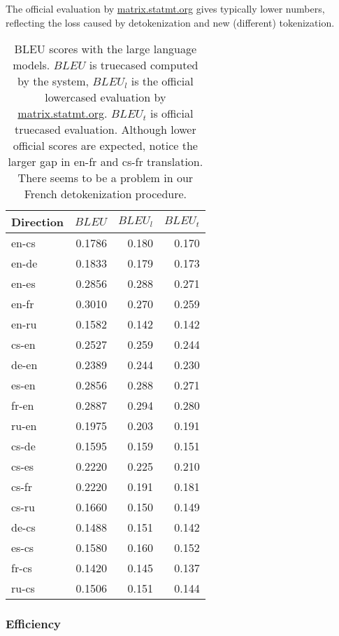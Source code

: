 \documentclass[11pt,letterpaper]{article}
\begin{document}
The official evaluation by \url{matrix.statmt.org} gives typically
lower numbers, reflecting the loss caused by detokenization and
new (different) tokenization.

\begin{table}[htbl]
\begin{center}
\begin{tabular}{l | r r r}
Direction & $BLEU$ & $BLEU_l$ & $BLEU_t$\\
\hline
en-cs & 0.1786 & 0.180 & 0.170\\
en-de & 0.1833 & 0.179 & 0.173\\
en-es & 0.2856 & 0.288 & 0.271\\
en-fr & 0.3010 & 0.270 & 0.259\\
en-ru & 0.1582 & 0.142 & 0.142\\
cs-en & 0.2527 & 0.259 & 0.244\\
de-en & 0.2389 & 0.244 & 0.230\\
es-en & 0.2856 & 0.288 & 0.271\\
fr-en & 0.2887 & 0.294 & 0.280\\
ru-en & 0.1975 & 0.203 & 0.191\\
\hline
cs-de & 0.1595 & 0.159 & 0.151\\
cs-es & 0.2220 & 0.225 & 0.210\\
cs-fr & 0.2220 & 0.191 & 0.181\\
cs-ru & 0.1660 & 0.150 & 0.149\\
de-cs & 0.1488 & 0.151 & 0.142\\
es-cs & 0.1580 & 0.160 & 0.152\\
fr-cs & 0.1420 & 0.145 & 0.137\\
ru-cs & 0.1506 & 0.151 & 0.144\\
\end{tabular}
\end{center}
\caption{BLEU scores with the large language models. $BLEU$ is truecased computed by the system, $BLEU_l$ is the official lowercased evaluation by \url{matrix.statmt.org}. $BLEU_t$ is official truecased evaluation. Although lower official scores are expected, notice the larger gap in en-fr and cs-fr translation. There seems to be a problem in our French detokenization procedure.}
\label{tab:finalbleu}
\end{table}


\subsubsection{Efficiency}
\label{sec:efficiency}
\end{document}
